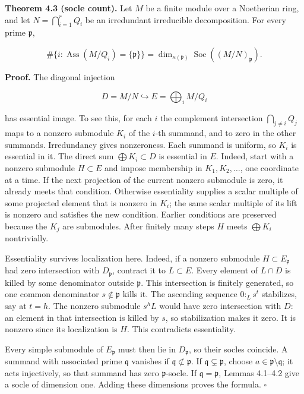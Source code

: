\documentclass[
]{article}
\begin{document}
\textbf{Theorem 4.3 (socle count).} Let \(M\) be a finite module over a
Noetherian ring, and let \(N=\bigcap_{i=1}^r Q_i\) be an irredundant
irreducible decomposition. For every prime \(\mathfrak p\),

\[
\#\{i:\operatorname{Ass}(M/Q_i)=\{\mathfrak p\}\}
=\dim_{\kappa(\mathfrak p)}
\operatorname{Soc}((M/N)_{\mathfrak p}).
\]

\textbf{Proof.} The diagonal injection

\[
D=M/N\hookrightarrow E=\bigoplus_i M/Q_i
\]

has essential image. To see this, for each \(i\) the complement
intersection \(\bigcap_{j\ne i}Q_j\) maps to a nonzero submodule \(K_i\)
of the \(i\)-th summand, and to zero in the other summands. Irredundancy
gives nonzeroness. Each summand is uniform, so \(K_i\) is essential in
it. The direct sum \(\bigoplus K_i\subset D\) is essential in \(E\).
Indeed, start with a nonzero submodule \(H\subset E\) and impose
membership in \(K_1,K_2,\ldots\), one coordinate at a time. If the next
projection of the current nonzero submodule is zero, it already meets
that condition. Otherwise essentiality supplies a scalar multiple of
some projected element that is nonzero in \(K_i\); the same scalar
multiple of its lift is nonzero and satisfies the new condition. Earlier
conditions are preserved because the \(K_j\) are submodules. After
finitely many steps \(H\) meets \(\bigoplus K_i\) nontrivially.

Essentiality survives localization here. Indeed, if a nonzero submodule
\(H\subset E_{\mathfrak p}\) had zero intersection with
\(D_{\mathfrak p}\), contract it to \(L\subset E\). Every element of
\(L\cap D\) is killed by some denominator outside \(\mathfrak p\). This
intersection is finitely generated, so one common denominator
\(s\notin\mathfrak p\) kills it. The ascending sequence \(0:_L s^t\)
stabilizes, say at \(t=h\). The nonzero submodule \(s^hL\) would have
zero intersection with \(D\): an element in that intersection is killed
by \(s\), so stabilization makes it zero. It is nonzero since its
localization is \(H\). This contradicts essentiality.

Every simple submodule of \(E_{\mathfrak p}\) must then lie in
\(D_{\mathfrak p}\), so their socles coincide. A summand with associated
prime \(\mathfrak q\) vanishes if \(\mathfrak q\not\subset\mathfrak p\).
If \(\mathfrak q\subsetneq\mathfrak p\), choose
\(a\in\mathfrak p\setminus\mathfrak q\); it acts injectively, so that
summand has zero \(\mathfrak p\)-socle. If \(\mathfrak q=\mathfrak p\),
Lemmas 4.1--4.2 give a socle of dimension one. Adding these dimensions
proves the formula. \(\square\)
\end{document}
